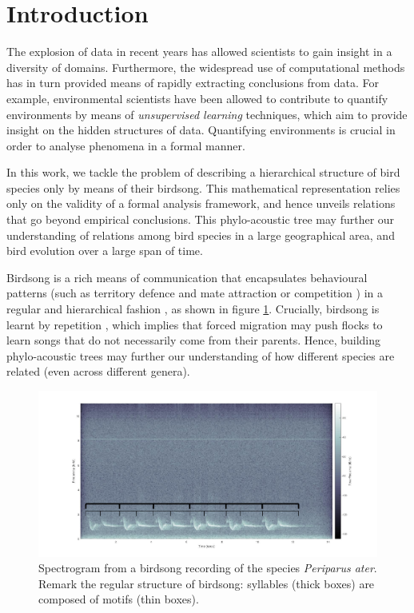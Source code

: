 \documentclass[pdftex,11pt,a4paper]{article}
\theoremstyle{definition}
\theoremstyle{remark}
\begin{document}
\section{Introduction}
\label{section_introduction}
The explosion of data in recent years has allowed scientists to gain insight in a diversity of domains. Furthermore, the widespread use of computational methods has in turn provided means of rapidly extracting conclusions from data. For example, environmental scientists have been allowed to contribute to quantify environments by means of \emph{unsupervised learning} techniques, which aim to provide insight on the hidden structures of data. Quantifying environments is crucial in order to analyse phenomena in a formal manner.
\par In this work, we tackle the problem of describing a hierarchical structure of bird species only by means of their birdsong. This mathematical representation relies only on the validity of a formal analysis framework, and hence unveils relations that go beyond empirical conclusions. This phylo-acoustic tree may further our understanding of relations among bird species in a large geographical area, and bird evolution over a large span of time. 
\par Birdsong is a rich means of communication that encapsulates behavioural patterns (such as territory defence and mate attraction or competition \cite{Berwick2013, Naguib2014}) in a regular and hierarchical fashion \cite{Snowdon2013}, as shown in figure \ref{fig_birdsong_structure}. Crucially, birdsong is learnt by repetition \cite{Berwick2013}, which implies that forced migration may push flocks to learn songs that do not necessarily come from their parents. Hence, building phylo-acoustic trees may further our understanding of how different species are related (even across different genera).
\begin{figure}[t]
\centering
\includegraphics[width=\textwidth]{images/birdsong_structure}
\caption{Spectrogram from a birdsong recording of the species \emph{Periparus ater}. Remark the regular structure of birdsong: syllables (thick boxes) are composed of motifs (thin boxes).}
\label{fig_birdsong_structure}
\end{figure}
\end{document}

